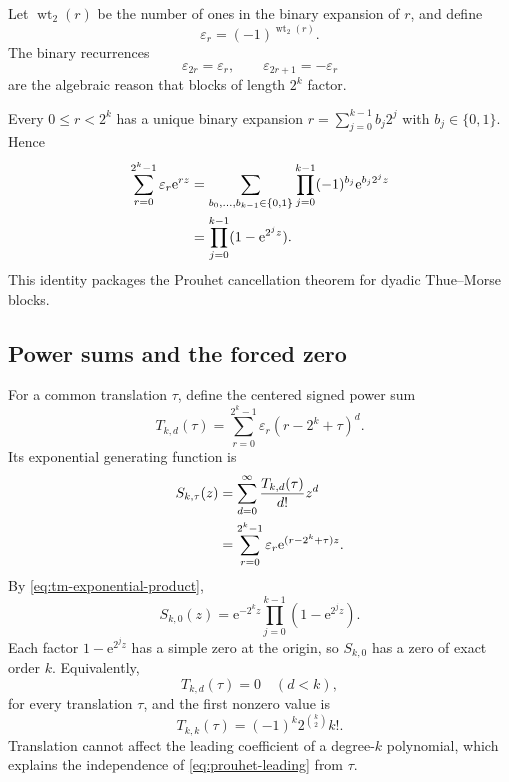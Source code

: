 \documentclass[11pt]{article}
\theoremstyle{definition}
\newcommand{\eps}{\varepsilon}
\newcommand{\wt}{\operatorname{wt}_2}
\newcommand{\e}{\mathrm{e}}
\begin{document}
Let $\wt(r)$ be the number of ones in the binary expansion of $r$, and define
\begin{equation}
  \eps_r=(-1)^{\wt(r)}.
  \label{eq:tm-sign}
\end{equation}
The binary recurrences
\begin{equation}
  \eps_{2r}=\eps_r,
  \qquad
  \eps_{2r+1}=-\eps_r
  \label{eq:tm-recursions}
\end{equation}
are the algebraic reason that blocks of length $2^k$ factor.

Every $0\le r<2^k$ has a unique binary expansion
$r=\sum_{j=0}^{k-1}b_j2^j$ with $b_j\in\{0,1\}$.  Hence
\begin{align}
  \sum_{r=0}^{2^k-1}\eps_r\e^{rz}
  &=\sum_{b_0,\ldots,b_{k-1}\in\{0,1\}}
    \prod_{j=0}^{k-1}(-1)^{b_j}\e^{b_j2^jz}\notag\\
  &=\prod_{j=0}^{k-1}(1-\e^{2^jz}).
  \label{eq:tm-exponential-product}
\end{align}
This identity packages the Prouhet cancellation theorem for dyadic Thue--Morse blocks.

\subsection{Power sums and the forced zero}

For a common translation $\tau$, define the centered signed power sum
\begin{equation}
  T_{k,d}(\tau)
  =\sum_{r=0}^{2^k-1}\eps_r
    (r-2^k+\tau)^d.
  \label{eq:Tkd-definition}
\end{equation}
Its exponential generating function is
\begin{align}
  S_{k,\tau}(z)
  &=\sum_{d=0}^{\infty}\frac{T_{k,d}(\tau)}{d!}z^d\notag\\
  &=\sum_{r=0}^{2^k-1}\eps_r
    \e^{(r-2^k+\tau)z}.
  \label{eq:Sk-definition}
\end{align}
By \cref{eq:tm-exponential-product},
\begin{equation}
  S_{k,0}(z)
  =\e^{-2^kz}\prod_{j=0}^{k-1}(1-\e^{2^jz}).
  \label{eq:Sk-product-first}
\end{equation}
Each factor $1-\e^{2^jz}$ has a simple zero at the origin, so $S_{k,0}$ has a zero of exact order $k$.  Equivalently,
\begin{equation}
  T_{k,d}(\tau)=0\quad(d<k),
  \label{eq:prouhet-zero}
\end{equation}
for every translation $\tau$, and the first nonzero value is
\begin{equation}
  T_{k,k}(\tau)=(-1)^k2^{\binom{k}{2}}k!.
  \label{eq:prouhet-leading}
\end{equation}
Translation cannot affect the leading coefficient of a degree-$k$ polynomial, which explains the independence of \cref{eq:prouhet-leading} from $\tau$.
\end{document}
